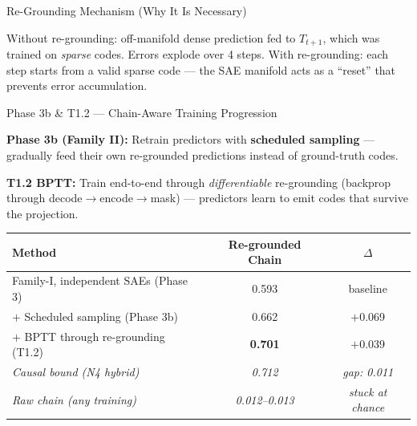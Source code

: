 \documentclass[final]{beamer}
\newlength{\colwidth}
\begin{document}
\begin{frame}[t]
\begin{columns}[t]
\begin{column}{\colwidth}
\begin{block}{Re-Grounding Mechanism (Why It Is Necessary)}
\begin{center}
\end{center}
\small
Without re-grounding: off-manifold dense prediction fed to $T_{t+1}$, which was trained on
\emph{sparse} codes.  Errors explode over 4 steps.  With re-grounding: each step starts from
a valid sparse code --- the SAE manifold acts as a ``reset'' that prevents error accumulation.
\end{block}

\vspace{0.5em}

\begin{block}{Phase 3b \& T1.2 --- Chain-Aware Training Progression}
\small

\textbf{Phase 3b (Family II):} Retrain predictors with \textbf{scheduled sampling} ---
gradually feed their own re-grounded predictions instead of ground-truth codes.

\textbf{T1.2 BPTT:} Train end-to-end through \emph{differentiable} re-grounding
(backprop through decode$\to$encode$\to$mask) --- predictors learn to emit codes that
survive the projection.

\begin{center}
\begin{tabular}{@{}lcc@{}}
\toprule
\textbf{Method} & \textbf{Re-grounded Chain} & \textbf{$\Delta$} \\
\midrule
Family-I, independent SAEs (Phase 3) & 0.593 & baseline \\
$+$ Scheduled sampling (Phase 3b) & 0.662 & \textcolor{AccentGreen}{$+$0.069} \\
$+$ BPTT through re-grounding (T1.2) & \textbf{0.701} & \textcolor{AccentGreen}{$+$0.039} \\
\midrule
\textit{Causal bound (N4 hybrid)} & \textit{0.712} & \textit{gap: 0.011} \\
\textit{Raw chain (any training)} & \textit{0.012--0.013} & \textit{stuck at chance} \\
\bottomrule
\end{tabular}
\end{center}


\end{block}
\end{column}
\end{columns}
\end{frame}
\end{document}
